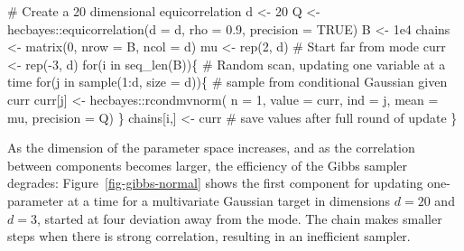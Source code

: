 \documentclass[
  11pt,
  letterpaper,
]{scrbook}
\newenvironment{Shaded}{\begin{snugshade}}{\end{snugshade}}
\newcommand{\AttributeTok}[1]{\textcolor[rgb]{0.40,0.45,0.13}{#1}}
\newcommand{\CommentTok}[1]{\textcolor[rgb]{0.37,0.37,0.37}{#1}}
\newcommand{\ConstantTok}[1]{\textcolor[rgb]{0.56,0.35,0.01}{#1}}
\newcommand{\ControlFlowTok}[1]{\textcolor[rgb]{0.00,0.23,0.31}{#1}}
\newcommand{\DecValTok}[1]{\textcolor[rgb]{0.68,0.00,0.00}{#1}}
\newcommand{\FloatTok}[1]{\textcolor[rgb]{0.68,0.00,0.00}{#1}}
\newcommand{\FunctionTok}[1]{\textcolor[rgb]{0.28,0.35,0.67}{#1}}
\newcommand{\NormalTok}[1]{\textcolor[rgb]{0.00,0.23,0.31}{#1}}
\newcommand{\OtherTok}[1]{\textcolor[rgb]{0.00,0.23,0.31}{#1}}
\newcommand{\SpecialCharTok}[1]{\textcolor[rgb]{0.37,0.37,0.37}{#1}}
\theoremstyle{definition}
\theoremstyle{definition}
\theoremstyle{definition}
\theoremstyle{plain}
\theoremstyle{remark}
\begin{document}
\begin{Shaded}
\begin{Highlighting}[]
\CommentTok{\# Create a 20 dimensional equicorrelation}
\NormalTok{d }\OtherTok{\textless{}{-}} \DecValTok{20}
\NormalTok{Q }\OtherTok{\textless{}{-}}\NormalTok{ hecbayes}\SpecialCharTok{::}\FunctionTok{equicorrelation}\NormalTok{(}\AttributeTok{d =}\NormalTok{ d, }\AttributeTok{rho =} \FloatTok{0.9}\NormalTok{, }\AttributeTok{precision =} \ConstantTok{TRUE}\NormalTok{)}
\NormalTok{B }\OtherTok{\textless{}{-}} \FloatTok{1e4}
\NormalTok{chains }\OtherTok{\textless{}{-}} \FunctionTok{matrix}\NormalTok{(}\DecValTok{0}\NormalTok{, }\AttributeTok{nrow =}\NormalTok{ B, }\AttributeTok{ncol =}\NormalTok{ d)}
\NormalTok{mu }\OtherTok{\textless{}{-}} \FunctionTok{rep}\NormalTok{(}\DecValTok{2}\NormalTok{, d)}
\CommentTok{\# Start far from mode}
\NormalTok{curr }\OtherTok{\textless{}{-}} \FunctionTok{rep}\NormalTok{(}\SpecialCharTok{{-}}\DecValTok{3}\NormalTok{, d)}
\ControlFlowTok{for}\NormalTok{(i }\ControlFlowTok{in} \FunctionTok{seq\_len}\NormalTok{(B))\{}
  \CommentTok{\# Random scan, updating one variable at a time}
  \ControlFlowTok{for}\NormalTok{(j }\ControlFlowTok{in} \FunctionTok{sample}\NormalTok{(}\DecValTok{1}\SpecialCharTok{:}\NormalTok{d, }\AttributeTok{size =}\NormalTok{ d))\{}
    \CommentTok{\# sample from conditional Gaussian given curr}
\NormalTok{    curr[j] }\OtherTok{\textless{}{-}}\NormalTok{ hecbayes}\SpecialCharTok{::}\FunctionTok{rcondmvnorm}\NormalTok{(}
      \AttributeTok{n =} \DecValTok{1}\NormalTok{, }
      \AttributeTok{value =}\NormalTok{ curr, }
      \AttributeTok{ind =}\NormalTok{ j, }
      \AttributeTok{mean =}\NormalTok{ mu, }
      \AttributeTok{precision =}\NormalTok{ Q)}
\NormalTok{  \}}
\NormalTok{  chains[i,] }\OtherTok{\textless{}{-}}\NormalTok{ curr }\CommentTok{\# save values after full round of update}
\NormalTok{\}}
\end{Highlighting}
\end{Shaded}

As the dimension of the parameter space increases, and as the
correlation between components becomes larger, the efficiency of the
Gibbs sampler degrades: Figure~\ref{fig-gibbs-normal} shows the first
component for updating one-parameter at a time for a multivariate
Gaussian target in dimensions \(d=20\) and \(d=3\), started at four
deviation away from the mode. The chain makes smaller steps when there
is strong correlation, resulting in an inefficient sampler.
\end{document}
